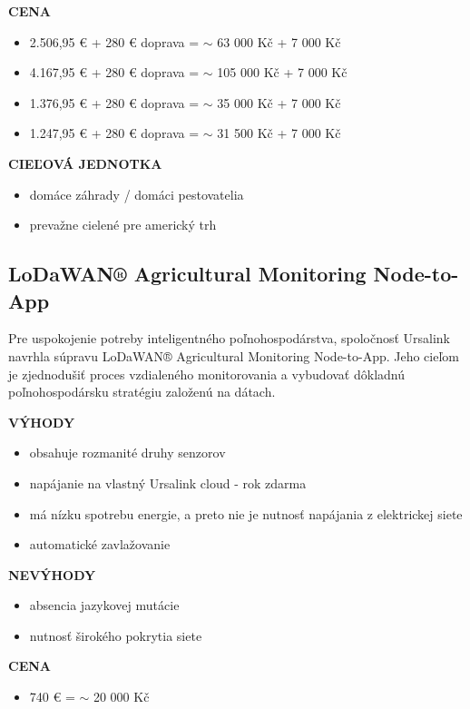 \documentclass[twoside]{ctuthesis}
\theoremstyle{plain}
\theoremstyle{definition}
\theoremstyle{note}
\begin{document}
\textbf{CENA}
\begin{itemize}
\item 2.506,95 €  + 280 € doprava = $\sim$ 63 000 Kč + 7 000 Kč 
\item 4.167,95 € + 280 € doprava = $\sim$ 105 000 Kč + 7 000 Kč
\item 1.376,95 € + 280 € doprava = $\sim$ 35 000 Kč + 7 000 Kč
\item 1.247,95 € + 280 € doprava = $\sim$ 31 500 Kč + 7 000 Kč
\end{itemize}

\textbf{CIEĽOVÁ JEDNOTKA}
\begin{itemize}
\item domáce záhrady / domáci pestovatelia
\item prevažne cielené pre americký trh
\end{itemize}

\subsection*{LoDaWAN®  Agricultural Monitoring Node-to-App}
Pre uspokojenie potreby inteligentného poľnohospodárstva, spoločnosť Ursalink navrhla súpravu LoDaWAN®  Agricultural Monitoring Node-to-App. Jeho cieľom je zjednodušiť proces vzdialeného monitorovania a vybudovať dôkladnú poľnohospodársku stratégiu založenú na dátach.  \cite{lorawan}
\newline

\textbf{VÝHODY}
\begin{itemize}
\item obsahuje rozmanité druhy senzorov
\item napájanie na vlastný Ursalink cloud - rok zdarma
\item má nízku spotrebu energie, a preto nie je nutnosť napájania z elektrickej siete
\item automatické zavlažovanie
\end{itemize}

\textbf{NEVÝHODY}
\begin{itemize}
\item absencia jazykovej mutácie
\item nutnosť širokého pokrytia siete
\end{itemize}
	
\textbf{CENA}
\begin{itemize}
\item 740 €  = $\sim$ 20 000 Kč 
\end{itemize}
\end{document}
